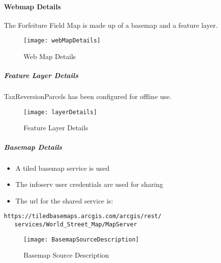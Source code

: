 \paragraph{Webmap Details}The Forfeiture Field Map is made up of a basemap and a feature layer.
\begin{figure}[h!]
\centering
    \texttt{[image: webMapDetails]}
\vspace{-.2in}

\caption{Web Map Details}
\end{figure}
\subparagraph{Feature Layer Details}TaxReversionParcels has been configured for offline use.
\begin{figure}[h!]
\centering
    \texttt{[image: layerDetails]}
\vspace{-.15in}

\caption{Feature Layer Details}
\end{figure}
\clearpage
\subparagraph{Basemap Details}
\begin{itemize}
  \setlength\itemsep{.3in}
  \item A tiled basemap service is used
  \item The infoserv user credentials are used for sharing
  \item The url for the shared service is:
\end{itemize}
\begin{verbatim}
https://tiledbasemaps.arcgis.com/arcgis/rest/
   services/World_Street_Map/MapServer
\end{verbatim}
\begin{figure}[h!]
\centering
\texttt{[image: BasemapSourceDescription]}
\caption{Basemap Source Description}
\end{figure}
\clearpage
%
%
%
